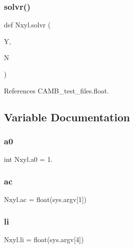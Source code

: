 \mbox{\label{namespaceNxyl_a75efbb5b618196aa19393fc8d9e957a2}} 
\subsubsection{\texorpdfstring{solvr()}{solvr()}}
{\footnotesize\ttfamily def Nxyl.\+solvr (\begin{DoxyParamCaption}\item[{}]{Y,  }\item[{}]{N }\end{DoxyParamCaption})}



References C\+A\+M\+B\+\_\+test\+\_\+files.\+float.



\subsection{Variable Documentation}
\mbox{\label{namespaceNxyl_a7c7437c14677dc8aa320be903e9f08bb}} 
\subsubsection{\texorpdfstring{a0}{a0}}
{\footnotesize\ttfamily int Nxyl.\+a0 = 1.}

\mbox{\label{namespaceNxyl_a07413124c3f6a07342b93a1072ba629a}} 
\subsubsection{\texorpdfstring{ac}{ac}}
{\footnotesize\ttfamily Nxyl.\+ac = float(sys.\+argv\mbox{[}1\mbox{]})}

\mbox{\label{namespaceNxyl_a1566bb154870309b9f80ed85001c3833}} 
\subsubsection{\texorpdfstring{li}{li}}
{\footnotesize\ttfamily Nxyl.\+li = float(sys.\+argv\mbox{[}4\mbox{]})}

\mbox{\label{namespaceNxyl_abcbdea1a54c46907b34f6738daa3dd0f}} 
